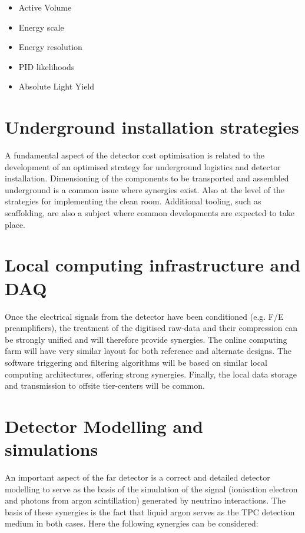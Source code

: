 \begin{itemize}

\item Active	
  Volume	
  
\item Energy	
  scale	

\item Energy	
  resolution	
  	
\item PID	
  likelihoods	
  
\item Absolute	
  Light	
  Yield	
  	
\end{itemize}


\section{Underground installation strategies}
A fundamental aspect of the detector cost optimisation is related to the development of an optimised strategy for underground logistics and detector installation. Dimensioning of the components to be transported and assembled underground is a common issue where synergies exist. Also at the level of the strategies for implementing the clean room. Additional tooling, such as scaffolding, are also a subject where common developments are expected to take place.

\section{Local computing infrastructure and DAQ}
Once the electrical signals from the detector have been conditioned (e.g. F/E preamplifiers), the treatment of the digitised raw-data and their compression can be strongly unified and will therefore provide synergies. The online computing farm will have very similar layout for both reference and alternate designs. The software triggering and filtering algorithms will be based on similar local computing architectures, offering strong synergies. Finally, the local data storage and transmission to offsite tier-centers will be common.

\section{Detector Modelling and simulations}

An important aspect  of the far detector is a correct and detailed detector modelling to serve as the basis of the simulation of the signal (ionisation electron and photons from argon scintillation) generated by neutrino interactions. The basis of these synergies is the fact that liquid argon serves as the TPC detection medium in both cases. Here the following synergies can be considered: 

